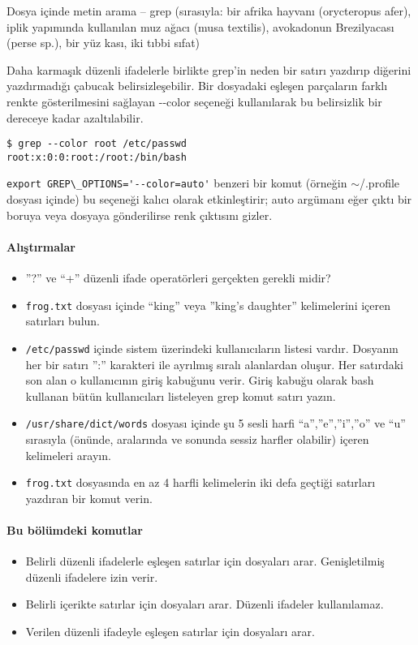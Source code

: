 \begin{section}{Dosya içinde metin arama – grep}
(sırasıyla: bir afrika hayvanı (orycteropus afer), iplik yapımında kullanılan muz ağacı (musa textilis), avokadonun Brezilyacası (perse sp.), bir yüz kası, iki tıbbi sıfat)

Daha karmaşık düzenli ifadelerle birlikte grep'in neden bir satırı yazdırıp diğerini yazdırmadığı çabucak belirsizleşebilir. Bir dosyadaki eşleşen parçaların farklı renkte gösterilmesini sağlayan -{}-color seçeneği kullanılarak bu belirsizlik bir dereceye kadar azaltılabilir.
\footnotesize
\begin{verbatim}
$ grep --color root /etc/passwd
root:x:0:0:root:/root:/bin/bash
\end{verbatim}
\normalsize

\verb|export GREP\_OPTIONS='--color=auto'| benzeri bir komut (örneğin $\sim$/.profile dosyası içinde) bu seçeneği kalıcı olarak etkinleştirir; auto argümanı eğer çıktı bir boruya veya dosyaya gönderilirse renk çıktısını gizler.

\paragraph{Alıştırmalar}{
\begin{itemize}
 \item ”?” ve “+” düzenli ifade operatörleri gerçekten gerekli midir?
 \item \verb|frog.txt| dosyası içinde “king” veya ”king’s daughter” kelimelerini içeren satırları bulun.
 \item \verb|/etc/passwd| içinde sistem üzerindeki kullanıcıların listesi vardır. Dosyanın her bir satırı ”:” karakteri ile ayrılmış sıralı alanlardan oluşur. Her satırdaki son alan o kullanıcının giriş kabuğunu verir. Giriş kabuğu olarak bash kullanan bütün kullanıcıları listeleyen grep komut satırı yazın.
 \item \verb|/usr/share/dict/words| dosyası içinde şu 5 sesli harfi “a”,”e”,”i”,”o” ve “u” sırasıyla (önünde, aralarında ve sonunda sessiz harfler olabilir) içeren kelimeleri arayın.
 \item \verb|frog.txt| dosyasında en az 4 harfli kelimelerin iki defa geçtiği satırları yazdıran bir komut verin.
\end{itemize}}

\paragraph{Bu bölümdeki komutlar}{
\begin{itemize}
 \item[egrep]Belirli düzenli ifadelerle eşleşen satırlar için dosyaları arar. Genişletilmiş düzenli ifadelere izin verir.
 \item[fgrep]Belirli içerikte satırlar için dosyaları arar. Düzenli ifadeler kullanılamaz.
 \item[grep]Verilen düzenli ifadeyle eşleşen satırlar için dosyaları arar.
\end{itemize}}


\end{section}
